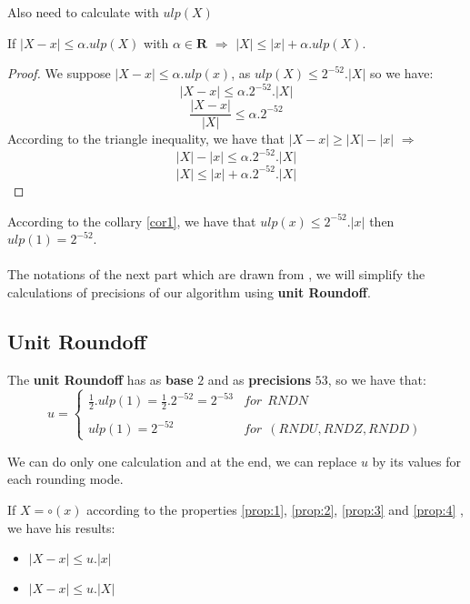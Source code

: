 Also need to calculate with $ulp(X)$ 
\begin{coroll}\label{cor1}
If $\lvert X - x \rvert \le \alpha. ulp(X)$  with $\alpha \in   \mathbf{R}$ $\Rightarrow$ $\lvert X \rvert \le  \vert x \rvert  + \alpha. ulp(X)$.
\end{coroll}

\begin{proof} \color{-yellow}
We suppose $\lvert X - x \rvert \le \alpha. ulp(x)$,  as $ulp(X) \le 2^{-52}.\lvert X \rvert$ so we have:
$$\lvert X - x \rvert \le \alpha.2^{-52}.\lvert X \rvert$$
$$\frac{\lvert X - x \rvert}{\lvert X \rvert} \le \alpha.2^{-52}$$
According to the triangle inequality, we have that $\lvert X - x \rvert \ge \lvert X \rvert - \lvert x \rvert$ $\Rightarrow$
$$\lvert X \rvert - \lvert x \rvert \le \alpha.2^{-52}.\lvert X \rvert$$
$$\lvert X \rvert   \le  \lvert x \rvert + \alpha.2^{-52}.\lvert X \rvert$$


\end{proof}

According to the collary \ref{cor1}, we have that $ulp(x) \le 2^{-52} .\lvert x \rvert $ then $ulp(1) = 2^{-52}$.\\
\ \\
The notations of the next part which are drawn from \cite{muller2010handbook}, we will simplify the calculations of precisions of our algorithm using \textbf{unit Roundoff}. \\
\subsection{Unit Roundoff} \label{sub:U}
The \textbf{unit Roundoff} has as \textbf{base} $2$ and as \textbf{precisions} $53$, so we have that:
$$
u = \left\{
\begin{array}{ll}
    \frac{1}{2}.ulp(1) = \frac{1}{2}.2^{-52} = 2^{-53}& for \  \ RNDN \\
    \ & \ \\
     ulp(1) = 2^{-52} & for \  \ (RNDU, RNDZ, RNDD)
\end{array}
\right.
$$

We can do only one calculation and at the end, we can replace $u$ by its values for each rounding mode.\\
\begin{coroll}\label{cor:U}
If $X=\circ(x)$ according to the properties \ref{prop:1}, \ref{prop:2}, \ref{prop:3} and \ref{prop:4} , we have his results:
\begin{itemize}
    \item $\lvert X - x \rvert \le u. \lvert x \rvert$
    \item $\lvert X - x \rvert \le u. \lvert X \rvert$
\end{itemize}
\end{coroll}

